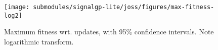 \begin{figure}[h]

\centering
\texttt{[image: submodules/signalgp-lite/joss/figures/max-fitness-log2]}

\caption{%
Maximum fitness wrt. updates, with 95\% confidence intervals.
Note logarithmic transform.
} \label{fig:max-fitness-sd}

\end{figure}

